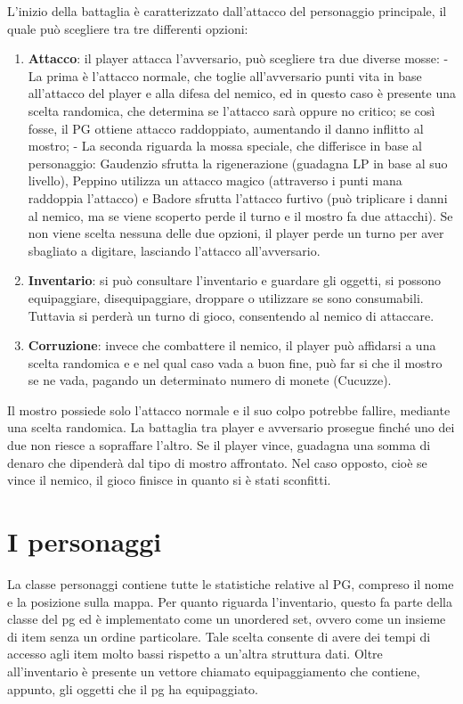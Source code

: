 \documentclass[10pt]{report}
\begin{document}
L'inizio della battaglia è caratterizzato dall'attacco del personaggio principale, il quale può scegliere tra tre differenti opzioni:
\begin{enumerate}

    \item \textbf{Attacco}: il player attacca l'avversario, può scegliere tra due diverse mosse:
 - La prima è l'attacco normale, che toglie all'avversario punti vita in base all'attacco del player e alla difesa del nemico, ed in questo caso è presente una scelta randomica, che determina se l'attacco sarà oppure no critico; se così fosse, il PG ottiene attacco raddoppiato, aumentando il danno inflitto al mostro;
 - La seconda riguarda la mossa speciale, che differisce in base al personaggio: Gaudenzio sfrutta la rigenerazione (guadagna LP in base al suo livello), Peppino utilizza un attacco magico (attraverso i punti mana raddoppia l'attacco) e Badore sfrutta l'attacco furtivo (può triplicare i danni al nemico, ma se viene scoperto perde il turno e il mostro fa due attacchi).
Se non viene scelta nessuna delle due opzioni, il player perde un turno per aver sbagliato a digitare, lasciando l'attacco all'avversario.

    \item \textbf{Inventario}: si può consultare l'inventario e guardare gli oggetti, si possono equipaggiare, disequipaggiare, droppare o utilizzare se sono consumabili. Tuttavia si perderà un turno di gioco, consentendo al nemico di attaccare.

    \item \textbf{Corruzione}: invece che combattere il nemico, il player può affidarsi a una scelta randomica e e nel qual caso vada a
    buon fine, può far si che il mostro se ne vada, pagando un determinato numero di monete (Cucuzze).
\end{enumerate}

Il mostro possiede solo l'attacco normale e il suo colpo potrebbe fallire, mediante una scelta randomica.
La battaglia tra player e avversario prosegue finché uno dei due non riesce a sopraffare
l'altro. Se il player vince, guadagna una somma di denaro che dipenderà dal tipo di mostro affrontato.
Nel caso opposto, cioè se vince il nemico, il gioco finisce in quanto si è stati sconfitti.

\section{I personaggi}

La classe personaggi contiene tutte le statistiche relative al PG, compreso il nome e la posizione sulla
mappa. 
Per quanto riguarda l'inventario, questo fa parte della classe del pg ed è implementato come un 
unordered set, ovvero come un insieme di item senza un ordine particolare. Tale scelta consente di avere
dei tempi di accesso agli item molto bassi rispetto a un'altra struttura dati. 
Oltre all'inventario è presente un vettore chiamato equipaggiamento che contiene, appunto,
gli oggetti che il pg ha equipaggiato.
\end{document}
